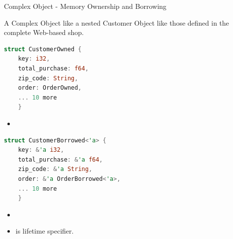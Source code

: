 \documentclass[9pt]{beamer}
\begin{document}
\begin{frame}[fragile]{Complex Object - Memory Ownership and Borrowing}

A Complex Object like a nested Customer Object like those defined in the complete Web-based shop. 
 
\begin{minipage}{0.5\linewidth}
\centering
\begin{lstlisting}[language=Rust]
struct CustomerOwned {
    key: i32,
    total_purchase: f64,
    zip_code: String,
    order: OrderOwned,
    ... 10 more
    }
\end{lstlisting}
\end{minipage}\hfill  
\begin{minipage}{0.5\linewidth}
\centering
\begin{itemize}
    \item {} 
\end{itemize}
\end{minipage}

\begin{minipage}{0.5\linewidth}
\centering
\begin{lstlisting}[language=Rust]
struct CustomerBorrowed<'a> {
    key: &'a i32,
    total_purchase: &'a f64,
    zip_code: &'a String,
    order: &'a OrderBorrowed<'a>,
    ... 10 more 
    }
\end{lstlisting}
\end{minipage}\hfill  
\begin{minipage}{0.5\linewidth}
\centering
\begin{itemize}
    \item {}
    \item {} is lifetime specifier.
\end{itemize}
\end{minipage}
\end{frame}
\end{document}

